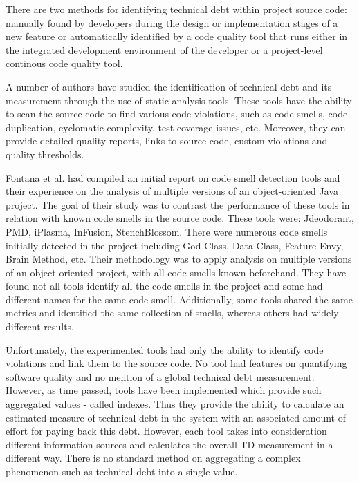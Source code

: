 \documentclass{mprop}
\begin{document}
There are two methods for identifying technical debt within project source code:
manually found by developers during the design or implementation stages of a new
feature or automatically identified by a code quality tool that runs either in
the integrated development environment of the developer or a project-level
continous code quality tool.

A number of authors have studied the identification of technical debt and its
measurement through the use of static analysis tools. These tools have the
ability to scan the source code to find various code violations, such as code
smells, code duplication, cyclomatic complexity, test coverage issues, etc.
Moreover, they can provide detailed quality reports, links to source code,
custom violations and quality thresholds.

Fontana et al. \cite{Fontana2011} had compiled an initial report on code smell
detection tools and their experience on the analysis of multiple versions of an
object-oriented Java project. The goal of their study was to contrast the
performance of these tools in relation with known code smells in the source
code. These tools were: Jdeodorant, PMD, iPlasma, InFusion, StenchBlossom. There
were numerous code smells initially detected in the project including God Class,
Data Class, Feature Envy, Brain Method, etc. Their methodology was to apply
analysis on multiple versions of an object-oriented project, with all code
smells known beforehand. They have found not all tools identify all the code
smells in the project and some had different names for the same code smell.
Additionally, some tools shared the same metrics and identified the same
collection of smells, whereas others had widely different results.


Unfortunately, the experimented tools had only the ability to identify code
violations and link them to the source code. No tool had features on quantifying
software quality and no mention of a global technical debt measurement. However,
as time passed, tools have been implemented which provide such aggregated values
- called indexes. Thus they provide the ability to calculate an estimated
measure of technical debt in the system with an associated amount of effort for
paying back this debt. However, each tool takes into consideration different
information sources and calculates the overall TD measurement in a different
way. There is no standard method on aggregating a complex phenomenon such as
technical debt into a single value.
\end{document}
